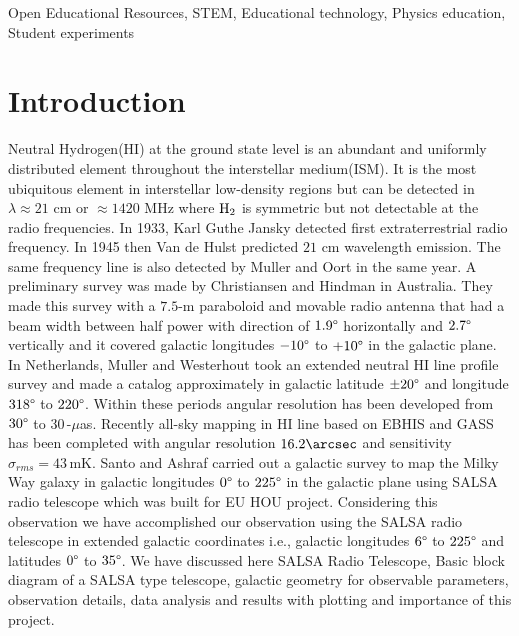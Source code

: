 \documentclass[conference]{IEEEtran}
\begin{document}
\begin{IEEEkeywords}
Open Educational Resources, STEM, Educational technology, Physics education, Student experiments
\end{IEEEkeywords}

\section{Introduction}
Neutral Hydrogen(HI) at the ground state level is an abundant and uniformly distributed element throughout the interstellar medium(ISM). It is the most ubiquitous element in interstellar  low-density regions but can be detected in $\lambda\approx21$ cm or $\approx1420$ MHz where $\textnormal{H}_2$ is symmetric but not detectable at the radio frequencies\cite{HI2016}. In 1933, Karl Guthe Jansky detected first extraterrestrial radio frequency\cite{jansky1933radio}. In 1945 then Van de Hulst predicted $21$ cm wavelength emission\cite{CJBakker1945}. The same frequency line is also detected by Muller and Oort\cite{muller1951observation} in the same year. A preliminary survey was made by Christiansen and Hindman\cite{christiansen1952preliminary} in Australia. They made this survey with a $7.5$\textnormal{-m} paraboloid and movable radio antenna that had a beam width between half power with direction of $1.9\degree$ horizontally and $2.7\degree$ vertically and it covered galactic longitudes $-10\degree$ to $+10\degree$ in the galactic plane. In Netherlands, Muller and Westerhout\cite{Muller1957} took an extended neutral HI line profile survey and made a catalog approximately in galactic latitude $\pm20\degree$ and longitude $318\degree$ to $220\degree$. Within these periods angular resolution has been developed from $30\degree$ to $30$\,-$\mu$as\cite{kellermann2001development,Middelberg2008}. Recently all-sky mapping in HI line based on EBHIS and GASS has been completed\cite{bekhti2016hi4pi} with angular resolution $16.2\arcsec$ and sensitivity $\sigma_{rms}=43$\,mK. Santo and Ashraf carried out a galactic survey to map the Milky Way galaxy in galactic longitudes $0\degree$ to $225\degree$ in the galactic plane\cite{santo2013mapping} using SALSA radio telescope which was built for EU HOU project\cite{Doran2007}. Considering this observation we have accomplished our observation using the SALSA radio telescope in extended galactic coordinates i.e., galactic longitudes $6\degree$ to $225\degree$ and latitudes $0\degree$ to $35\degree$. We have discussed here SALSA Radio Telescope, Basic block diagram of a SALSA type telescope, galactic geometry for observable parameters, observation details, data analysis and results with plotting and importance of this project.
\end{document}
